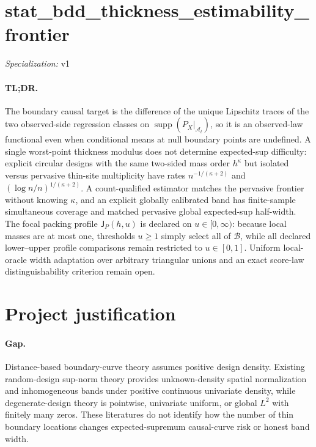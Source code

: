 \documentclass{article}
\begin{document}
\sloppy

\section*{stat\_\allowbreak{}bdd\_\allowbreak{}thickness\_\allowbreak{}estimability\_\allowbreak{}frontier}

\noindent\textit{Specialization:} v1\par

\paragraph{TL;DR.} The boundary causal target is the difference of the unique Lipschitz traces of the two observed-side regression classes on \(\operatorname{supp}(P_X|_{\mathcal A_t})\), so it is an observed-law functional even when conditional means at null boundary points are undefined. A single worst-point thickness modulus does not determine expected-sup difficulty: explicit circular designs with the same two-sided mass order \(h^{\kappa}\) but isolated versus pervasive thin-site multiplicity have rates \(n^{-1/(\kappa+2)}\) and \((\log n/n)^{1/(\kappa+2)}\). A count-qualified estimator matches the pervasive frontier without knowing \(\kappa\), and an explicit globally calibrated band has finite-sample simultaneous coverage and matched pervasive global expected-sup half-width. The focal packing profile \(\mathsf J_P(h,u)\) is declared on \(u\in[0,\infty)\): because local masses are at most one, thresholds \(u\ge1\) simply select all of \(\mathcal B\), while all declared lower--upper profile comparisons remain restricted to \(u\in[0,1]\). Uniform local-oracle width adaptation over arbitrary triangular unions and an exact score-law distinguishability criterion remain open.

\section{Project justification}

\paragraph{Gap.} Distance-based boundary-curve theory assumes positive design density. Existing random-design sup-norm theory provides unknown-density spatial normalization and inhomogeneous bands under positive continuous univariate density, while degenerate-design theory is pointwise, univariate uniform, or global \(L^2\) with finitely many zeros. These literatures do not identify how the number of thin boundary locations changes expected-supremum causal-curve risk or honest band width.
\end{document}
